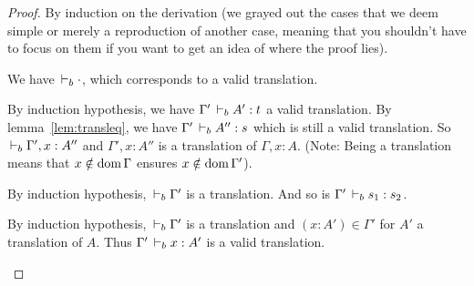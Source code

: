 \documentclass[a4paper,english]{lipics-utf8x}
\begin{document}
  \begin{proof}
    By induction on the derivation (we grayed out the cases that we deem
    simple or merely a reproduction of another case, meaning that you shouldn't
    have to focus on them if you want to get an idea of where the proof lies).

    \leavevmode
    \begin{caselist}
      \begin{graycase}
        \begin{mathc}
          \ru{}{\derr \cdot}
        \end{mathc}
        We have $\,\vdash_b \cdot$, which corresponds to a valid translation.
      \end{graycase}

      \begin{graycase}
        \begin{mathc}
        \end{mathc}
        By induction hypothesis, we have $\Gamma' \,\vdash_b A' : t$ a valid
        translation. By lemma~\ref{lem:transleq}, we have
        $\Gamma' \,\vdash_b A'' : s$ which is still a valid translation.
        So $\,\vdash_b \Gamma', x : A''$ and $\Gamma', x : A''$ is a translation of
        $\Gamma, x : A$.
        (Note: Being a translation means that $x \notin \operatorname{dom} \Gamma$ ensures
        $x \notin \operatorname{dom} \Gamma'$).
      \end{graycase}

      \begin{graycase}
        \begin{mathc}
        \end{mathc}
        By induction hypothesis, $\,\vdash_b \Gamma'$ is a translation.
        And so is $\Gamma' \,\vdash_b s_1 : s_2$.
      \end{graycase}

      \begin{graycase}
        \begin{mathc}
        \end{mathc}
        By induction hypothesis, $\,\vdash_b \Gamma'$ is a translation and
        $(x : A') \in \Gamma'$ for $A'$ a translation of $A$.
        Thus $\Gamma' \,\vdash_b x : A'$ is a valid translation.
      \end{graycase}


\end{caselist}
\end{proof}
\end{document}
